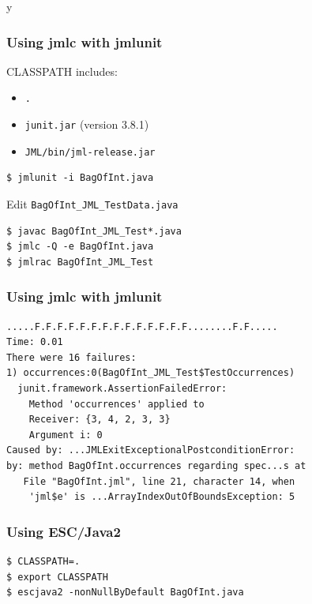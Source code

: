 \if y\MAKEHANDOUTS \documentclass[t,compress,landscape,handout]{beamer}
\begin{document}
\begin{frame}[fragile]
\frametitle{Using jmlc with jmlunit}

\begin{example}
CLASSPATH includes:
\begin{itemize}
\item
\texttt{.}

\item
\texttt{junit.jar} (version 3.8.1)

\item
\texttt{JML/bin/jml-release.jar}
\end{itemize}

\begin{verbatim}
$ jmlunit -i BagOfInt.java
\end{verbatim}

Edit \lstinline!BagOfInt_JML_TestData.java!

\begin{verbatim}
$ javac BagOfInt_JML_Test*.java
$ jmlc -Q -e BagOfInt.java
$ jmlrac BagOfInt_JML_Test
\end{verbatim}
\end{example}
\end{frame}

\begin{frame}[fragile]
\frametitle{Using jmlc with jmlunit}

{\small
\begin{verbatim}
.....F.F.F.F.F.F.F.F.F.F.F.F.F.F........F.F.....
Time: 0.01
There were 16 failures:
1) occurrences:0(BagOfInt_JML_Test$TestOccurrences)
  junit.framework.AssertionFailedError:
    Method 'occurrences' applied to
    Receiver: {3, 4, 2, 3, 3}
    Argument i: 0
Caused by: ...JMLExitExceptionalPostconditionError:
by: method BagOfInt.occurrences regarding spec...s at
   File "BagOfInt.jml", line 21, character 14, when
    'jml$e' is ...ArrayIndexOutOfBoundsException: 5
\end{verbatim}
}
\end{frame}

\begin{frame}[fragile]
\frametitle{Using ESC/Java2}

\begin{example}
\begin{verbatim}
$ CLASSPATH=.
$ export CLASSPATH
$ escjava2 -nonNullByDefault BagOfInt.java
\end{verbatim}
\end{example}
\end{frame}
\end{document}
